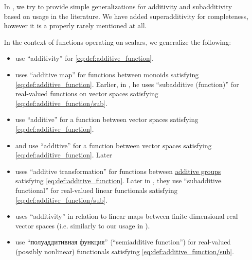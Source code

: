 \begin{remark}\label{rem:additive_function_terminology}
  In , we try to provide simple generalizations for additivity and subadditivity based on usage in the literature. We have added superadditivity for completeness, however it is a properly rarely mentioned at all.

  In the context of functions operating on scalars, we generalize the following:
  \begin{itemize}
    \item {} use \enquote{additivity} for \eqref{eq:def:additive_function}.

    \item {} uses \enquote{additive map} for functions between monoids satisfying \eqref{eq:def:additive_function}. Earlier, in \cite[\S 7.1]{Schechter1997AnalysisHandbook}, he uses \enquote{subadditive (function)} for real-valued functions on vector spaces satisfying \eqref{eq:def:additive_function/sub}.

    \item {} use \enquote{additive} for a function between vector spaces satisfying \eqref{eq:def:additive_function}.

    \item {} and  use \enquote{additive} for a function between vector spaces satisfying \eqref{eq:def:additive_function}. Later \cite[342]{ЛюстерникСоболев1965ФункАнализ}

    \item {} uses \enquote{additive transformation} for functions between \hyperref[con:additive_semigroup]{additive groups} satisfying \eqref{eq:def:additive_function}. Later in \cite[def. 2.5.1]{HillePhillips1996FunctionalAnalysis}, they use \enquote{subadditive functional} for real-valued linear functionals satisfying \eqref{eq:def:additive_function/sub}.

    \item {} uses \enquote{additivity} in relation to linear maps between finite-dimensional real vector spaces (i.e. similarly to our usage in ).

    \item {} use \enquote{полуаддитивная функция} (\enquote{semiadditive function}) for real-valued (possibly nonlinear) functionals satisfying \eqref{eq:def:additive_function/sub}.


\end{itemize}
\end{remark}
